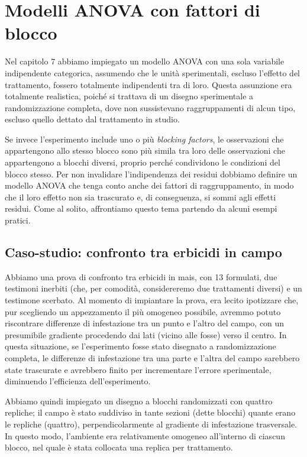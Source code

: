 \documentclass[a4paper,12pt,oneside]{book}
\begin{document}
\hypertarget{modelli-anova-con-fattori-di-blocco}{%
\chapter{Modelli ANOVA con fattori di blocco}\label{modelli-anova-con-fattori-di-blocco}}

Nel capitolo 7 abbiamo impiegato un modello ANOVA con una sola variabile indipendente categorica, assumendo che le unità sperimentali, escluso l'effetto del trattamento, fossero totalmente indipendenti tra di loro. Questa assunzione era totalmente realistica, poiché si trattava di un disegno sperimentale a randomizzazione completa, dove non sussistevano raggruppamenti di alcun tipo, escluso quello dettato dal trattamento in studio.

Se invece l'esperimento include uno o più \emph{blocking factors}, le osservazioni che appartengono allo stesso blocco sono più simila tra loro delle osservazioni che appartengono a blocchi diversi, proprio perché condividono le condizioni del blocco stesso. Per non invalidare l'indipendenza dei residui dobbiamo definire un modello ANOVA che tenga conto anche dei fattori di raggruppamento, in modo che il loro effetto non sia trascurato e, di conseguenza, si sommi agli effetti residui. Come al solito, affrontiamo questo tema partendo da alcuni esempi pratici.

\hypertarget{caso-studio-confronto-tra-erbicidi-in-campo}{%
\section{Caso-studio: confronto tra erbicidi in campo}\label{caso-studio-confronto-tra-erbicidi-in-campo}}

Abbiamo una prova di confronto tra erbicidi in mais, con 13 formulati, due testimoni inerbiti (che, per comodità, considereremo due trattamenti diversi) e un testimone scerbato. Al momento di impiantare la prova, era lecito ipotizzare che, pur scegliendo un appezzamento il più omogeneo possibile, avremmo potuto riscontrare differenze di infestazione tra un punto e l'altro del campo, con un presumibile gradiente procedendo dai lati (vicino alle fosse) verso il centro. In questa situazione, se l'esperimento fosse stato disegnato a randomizzazione completa, le differenze di infestazione tra una parte e l'altra del campo sarebbero state trascurate e avrebbero finito per incrementare l'errore sperimentale, diminuendo l'efficienza dell'esperimento.

Abbiamo quindi impiegato un disegno a blocchi randomizzati con quattro repliche; il campo è stato suddiviso in tante sezioni (dette blocchi) quante erano le repliche (quattro), perpendicolarmente al gradiente di infestazione trasversale. In questo modo, l'ambiente era relativamente omogeneo all'interno di ciascun blocco, nel quale è stata collocata una replica per trattamento.
\end{document}
